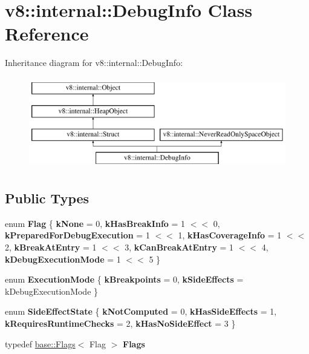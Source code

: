 \hypertarget{classv8_1_1internal_1_1DebugInfo}{}\section{v8\+:\+:internal\+:\+:Debug\+Info Class Reference}
\label{classv8_1_1internal_1_1DebugInfo}
Inheritance diagram for v8\+:\+:internal\+:\+:Debug\+Info\+:\begin{figure}[H]
\begin{center}
\leavevmode
\includegraphics[height=4.000000cm]{classv8_1_1internal_1_1DebugInfo}
\end{center}
\end{figure}
\subsection*{Public Types}
\begin{DoxyCompactItemize}
\item 
\mbox{\label{classv8_1_1internal_1_1DebugInfo_ab0d5b0ae59b77dd358efb540c74a631f}} 
enum {\bfseries Flag} \{ \newline
{\bfseries k\+None} = 0, 
{\bfseries k\+Has\+Break\+Info} = 1 $<$$<$ 0, 
{\bfseries k\+Prepared\+For\+Debug\+Execution} = 1 $<$$<$ 1, 
{\bfseries k\+Has\+Coverage\+Info} = 1 $<$$<$ 2, 
\newline
{\bfseries k\+Break\+At\+Entry} = 1 $<$$<$ 3, 
{\bfseries k\+Can\+Break\+At\+Entry} = 1 $<$$<$ 4, 
{\bfseries k\+Debug\+Execution\+Mode} = 1 $<$$<$ 5
 \}
\item 
\mbox{\label{classv8_1_1internal_1_1DebugInfo_a4dc865821f0d56b995ad5c3345d89f6a}} 
enum {\bfseries Execution\+Mode} \{ {\bfseries k\+Breakpoints} = 0, 
{\bfseries k\+Side\+Effects} = k\+Debug\+Execution\+Mode
 \}
\item 
\mbox{\label{classv8_1_1internal_1_1DebugInfo_a659a05e7a11dfd24c5e90692fa971450}} 
enum {\bfseries Side\+Effect\+State} \{ {\bfseries k\+Not\+Computed} = 0, 
{\bfseries k\+Has\+Side\+Effects} = 1, 
{\bfseries k\+Requires\+Runtime\+Checks} = 2, 
{\bfseries k\+Has\+No\+Side\+Effect} = 3
 \}
\item 
\mbox{\label{classv8_1_1internal_1_1DebugInfo_adcfd501b2e1d079c48b186f2b46f390b}} 
typedef \mbox{\hyperlink{classv8_1_1base_1_1Flags}{base\+::\+Flags}}$<$ Flag $>$ {\bfseries Flags}
\end{DoxyCompactItemize}
